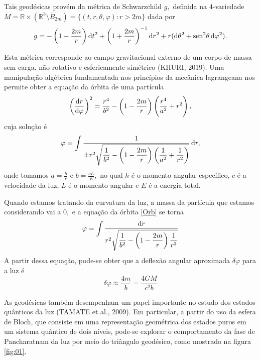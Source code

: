 \documentclass[a4,11pt]{report}
\begin{document}
Tais geodésicas provém da métrica de Schwarzchild $g,$ definida na $4$-variedade $M = \mathbb{R} \times (\mathbb{R}^3 \setminus \overline{B}_{2m}) = \{ (t,r, \theta, \varphi) : r > 2m \}$ dada por
\begin{equation}\label{Sch}
    g = - \left(1 - \dfrac{2m}{r} \right) \dif t^2 + \left(1 + \dfrac{2m}{r} \right)^{-1} \dif r^2 + r (\dif \theta^2 + \mathrm{sen}^2 \theta \dif \varphi^2).
\end{equation}

Esta métrica corresponde ao campo gravitacional externo de um corpo de massa sem carga, não rotativo e esfericamente simétrico (KHURI, 2019). Uma manipulação algébrica fundamentada nos princípios da mecânica lagrangeana nos permite obter a equação da órbita de uma partícula
\[
\left( \frac{\dif r}{\dif \varphi} \right)^{2} = \frac{r^{4}}{b^{2}} - \left( 1 - \frac{2m}{r} \right) \left( \frac{r^{4}}{a^{2}} + r^{2} \right),
\]
cuja solução é 
\begin{equation}\label{Orb}
\varphi = \displaystyle\int \dfrac{1}{\pm r^{2} \sqrt{\dfrac{1}{b^{2}} - \left( 1 - \dfrac{2m}{r} \right) \left( \dfrac{1}{a^{2}} + \dfrac{1}{r^{2}} \right)}}\dif r,
\end{equation}
onde tomamos $a = \frac{h}{c}$ e $b = \frac{cL}{E},$ no qual $h$ é o momento angular específico, $c$ é a velocidade da luz, $L$ é o momento angular e $E$ é a energia total. 

Quando estamos tratando da curvatura da luz, a massa da partícula que estamos considerando vai a $0,$ e a equação da órbita \ref{Orb} se torna
\[
\varphi = \int \frac{\dif r}{r^{2} \sqrt{\dfrac{1}{b^{2}} - \left( 1 - \dfrac{2m}{r} \right) \dfrac{1}{r^{2}}}}
\]
A partir dessa equação, pode-se obter que a deflexão angular aproximada $\delta \varphi$ para a luz é
\[
\delta \varphi \approx \frac{4m}{b} = \frac{4GM}{c^{2}b}
\]

As geodésicas também desempenham um papel importante no estudo dos estados quânticos da luz (TAMATE et al., 2009). Em particular, a partir do uso da esfera de Bloch, que consiste em uma representação geométrica dos estados puros em um sistema quântico de dois níveis, pode-se explorar o comportamento da fase de Pancharatnam da luz por meio do triângulo geodésico, como mostrado na figura \ref{fig:01}.
\end{document}
